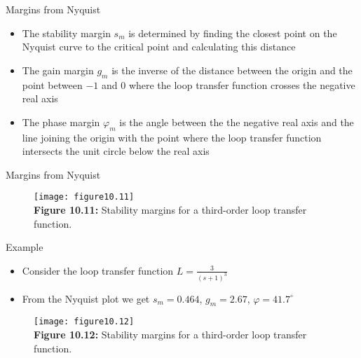 \documentclass{beamer-control}
\begin{document}

\begin{frame}{Margins from Nyquist}
\begin{itemize}
	\item The stability margin $s_m$ is determined by finding the closest point on the Nyquist curve to the critical point and calculating this distance
	\item The gain margin $g_m$ is the inverse of the distance between the origin and the point between $-1$ and $0$ where the loop transfer function crosses the negative real axis
	\item The phase margin $\varphi_m$ is the angle between the the negative real axis and the line joining the origin with the point where the loop transfer function intersects the unit circle below the real axis
\end{itemize}
\end{frame}

\begin{frame}{Margins from Nyquist}
\begin{figure}
	\centering
	\texttt{[image: figure10.11]}
	\\
	\textbf{Figure 10.11:} Stability margins for a third-order loop transfer function.
\end{figure}
\end{frame}


\begin{frame}{Example}
\begin{itemize}
	\item Consider the loop transfer function $L=\tfrac{3}{(s+1)^3}$
	\item From the Nyquist plot we get $s_m=0.464$, $g_m = 2.67$, $\varphi=41.7^\circ$
\end{itemize}
\begin{figure}
	\centering
	\texttt{[image: figure10.12]}
	\\
	\textbf{Figure 10.12:} Stability margins for a third-order loop transfer function.
\end{figure}
\end{frame}

\SUMMARYFRAME
\FINALE
\end{document}

